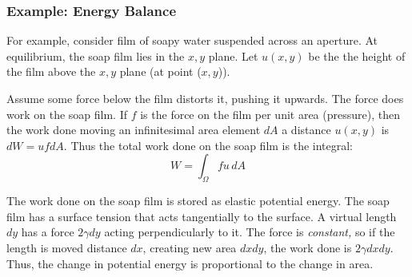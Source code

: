 \documentclass[a4paper]{report}
\begin{document}
\subsubsection*{Example: Energy Balance}

For example, consider film of soapy water suspended across an aperture.  At equilibrium, the soap film lies in the $x,y$ plane.  Let $u(x,y)$ be the the height of the film above the $x,y$ plane (at point ($x,y$)).

\begin{center}
\end{center}

Assume some force below the film distorts it, pushing it upwards.  The force does work on the soap film. If $f$ is the force on the film per unit area (pressure), then the work done moving an infinitesimal area element $dA$ a distance $u(x,y)$ is $dW = u f dA$. Thus the total work done on the soap film is the integral: 
\begin{equation}
W = \int_{\Omega} f u \,dA
\end{equation} 

\begin{center}
\end{center}

The work done on the soap film is stored as elastic potential energy.  The soap film has a surface tension that acts tangentially to the surface.  A virtual length $dy$ has a force $2 \gamma dy$ acting perpendicularly to it. The force is \emph{constant,} so if the length is moved distance $dx$, creating new area $dxdy$, the work done is $ 2 \gamma dxdy$.  Thus, the change in potential energy is proportional to the change in area.
\end{document}
